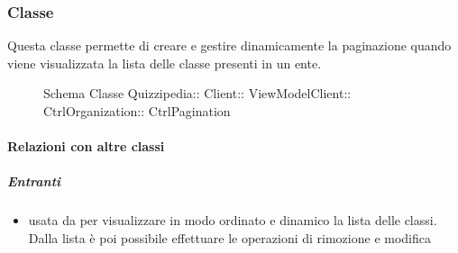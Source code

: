 \subsubsection{Classe }
Questa classe permette di creare e gestire dinamicamente la paginazione quando viene visualizzata la lista delle classe presenti in un ente.
\begin{figure}[H]
\centering
\noindent{}
\caption[Schema Classe CtrlPagination]{Schema Classe Quizzipedia:: Client:: ViewModelClient:: CtrlOrganization:: CtrlPagination}
\end{figure}
\paragraph{Relazioni con altre classi}
\subparagraph{Entranti}
\begin{itemize}
\item usata da  per visualizzare in modo ordinato e dinamico la lista delle classi. Dalla lista è poi possibile effettuare le operazioni di rimozione e modifica
\end{itemize}
